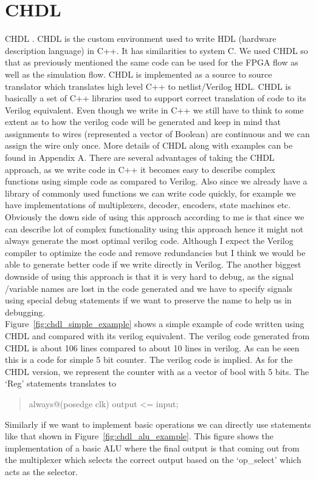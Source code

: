\section{ CHDL }
CHDL \cite{schreier}. CHDL is the custom environment used to write HDL (hardware description language) in C++. It has similarities to system C. We used CHDL so that as previously mentioned the same code can be used for the FPGA flow as well as the simulation flow. CHDL is implemented as a source to source translator which translates high level C++ to netlist/Verilog HDL. CHDL is basically a set of C++ libraries used to support correct translation of code to its Verilog equivalent. Even though we write in C++ we still have to think to some extent as to how the verilog code will be generated and keep in mind that assignments to wires (represented a vector of Boolean) are continuous and we can assign the wire only once.
More details of CHDL along with examples can be found in Appendix A.
There are several advantages of taking the CHDL approach, as we write code in C++ it becomes easy to describe complex functions using simple code as compared to Verilog. Also since we already have a library of commonly used functions we can write code quickly, for example we have implementations of multiplexers, decoder, encoders, state machines etc. Obviously the down side of using this approach according to me is that since we can describe lot of complex functionality using this approach hence it might not always generate the most optimal verilog code. Although I expect the Verilog compiler to optimize the code and remove redundancies but I think we would be able to generate better code if we write directly in Verilog. The another biggest downside of using this approach is that it is very hard to debug, as the signal /variable names are lost in the code generated and we have to specify signals using special debug statements if we want to preserve the name to help us in debugging. %
\\
Figure~\ref{fig:chdl_simple_example} shows a simple example of code written using CHDL and compared with its verilog equivalent. The verilog code generated from CHDL is about 106 lines compared to about 10 lines in verilog. As can be seen this is a code for simple 5 bit counter. The verilog code is implied. As for the CHDL version, we represent the counter with as a vector of bool with 5 bits. The `Reg' statements translates to \begin{quotation}    
\centering always@(posedge clk) output \textless= input; 
\end{quotation} 
Similarly if we want to implement basic operations we can directly use statements like that shown in Figure~\ref{fig:chdl_alu_example}. This figure shows the implementation of a basic ALU where the final output is that coming out from the multiplexer which selects the correct output based on the  `op\_select'  which acts as the selector.

